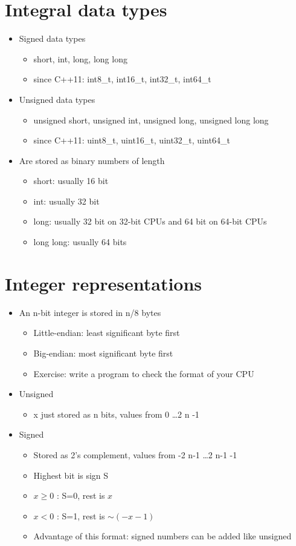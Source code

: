 \section{Integral data types}
\begin{itemize}
	\item  Signed data types
		\begin{itemize}
			\item short, int, long, long long
			\item since C++11: int8_t, int16_t, int32_t, int64_t
		\end{itemize}
	\item  Unsigned data types
		\begin{itemize}
			\item unsigned short, unsigned int,
			unsigned long, unsigned long long
			\item since C++11: uint8_t, uint16_t, uint32_t, uint64_t
		\end{itemize}
	\item  Are stored as binary numbers of length
		\begin{itemize}
			\item short: usually 16 bit
			\item int: usually 32 bit
			\item long: usually 32 bit on 32-bit CPUs and 64 bit on 64-bit CPUs
			\item long long: usually 64 bits
		\end{itemize}
\end{itemize}
\section{Integer representations}
\begin{itemize}
	\item  An n-bit integer is stored in n/8 bytes
		\begin{itemize}
			\item Little-endian: least significant byte first
			\item Big-endian: most significant byte first
			\item Exercise: write a program to check the format of your CPU
		\end{itemize}
	\item  Unsigned
		\begin{itemize}
			\item x just stored as n bits, values from 0 \ldots 2 n -1
		\end{itemize}
	\item  Signed
		\begin{itemize}
			\item Stored as 2’s complement, values from -2 n-1 \ldots 2 n-1 -1
			\item Highest bit is sign S
			\item $x \geq 0$ : S=0, rest is $x$
			\item $x < 0$ : S=1, rest is $\sim (-x -1)$
			\item Advantage of this format: signed numbers can be added like unsigned
		\end{itemize}
\end{itemize}
